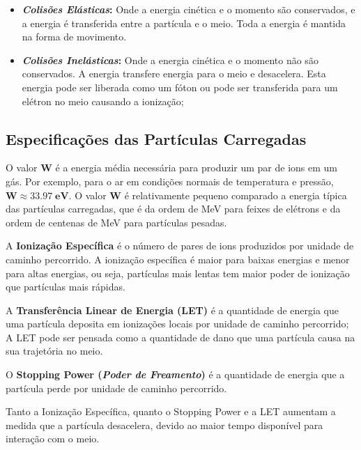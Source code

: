 \documentclass[11pt,a4paper]{article}
\newcounter{exemplo}
\begin{document}
	\begin{itemize}
		\item \textbf{\textit{\textcolor{CarnationPink}{Colisões Elásticas}}:} Onde a energia cinética e o momento são conservados, e a energia é transferida entre a partícula e o meio. Toda a energia é mantida na forma de movimento.
		
		\item \textbf{\textit{\textcolor{CarnationPink}{Colisões Inelásticas}}:} Onde a energia cinética e o momento não são conservados. A energia transfere energia para o meio e desacelera. Esta energia pode ser liberada como um fóton ou pode ser transferida para um elétron no meio causando a ionização;
	\end{itemize}
            

\subsection*{Especificações das Partículas Carregadas}

    O valor \textbf{\textcolor{CarnationPink}{W}} é a energia média necessária para produzir um par de ions em um gás. Por exemplo, para o ar em condições normais de temperatura e pressão, $\mathrm{\mathbf{W \approx 33.97 \; eV}}$. O valor \textbf{W} é relativamente pequeno comparado a energia típica das partículas carregadas, que é da ordem de MeV para feixes de elétrons e da ordem de centenas de MeV para partículas pesadas. 

    A \textbf{\textcolor{CarnationPink}{Ionização Específica}} é o número de pares de ions produzidos por unidade de caminho percorrido. A ionização específica é maior para baixas energias e menor para altas energias, ou seja, partículas mais lentas tem maior poder de ionização que partículas mais rápidas. 

    A \textbf{\textcolor{CarnationPink}{Transferência Linear de Energia (LET)}} é a quantidade de energia que uma partícula deposita em ionizações locais por unidade de caminho percorrido; A LET pode ser pensada como a quantidade de dano que uma partícula causa na sua trajetória no meio.

    O \textbf{\textcolor{CarnationPink}{Stopping Power (\textit{Poder de Freamento})}} é a quantidade de energia que a partícula perde por unidade de caminho percorrido. 

    Tanto a Ionização Específica, quanto o Stopping Power e a LET aumentam a medida que a partícula desacelera, devido ao maior tempo disponível para interação com o meio.
\end{document}

